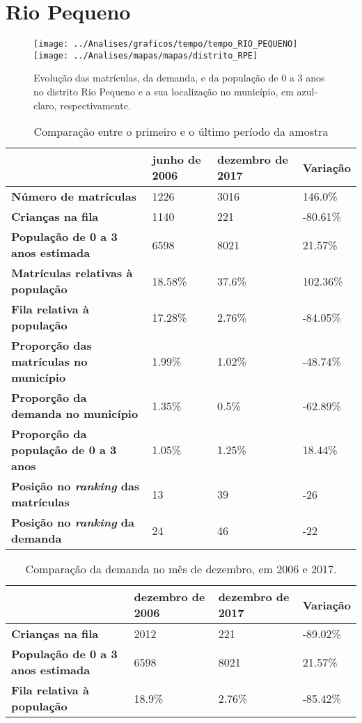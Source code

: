 \section{Rio Pequeno}
\begin{figure}[H]
\centering
\texttt{[image: ../Analises/graficos/tempo/tempo\_RIO\_PEQUENO]}
\texttt{[image: ../Analises/mapas/mapas/distrito\_RPE]}
\caption{Evolução das matrículas, da demanda, e da população de 0 a 3 anos no distrito Rio Pequeno e a sua localização no município, em azul-claro, respectivamente.}
\end{figure}
\begin{table}[H]
\begin{tabular}{l|l|l|l}
\textbf{}                                      & \textbf{junho de 2006}       & \textbf{dezembro de 2017}    & \textbf{Variação} \\ \hline
\textbf{Número de matrículas}                  & 1226 & 3016 & 146.0\% \\ \hline
\textbf{Crianças na fila}                      & 1140 & 221 & -80.61\% \\ \hline
\textbf{População de 0 a 3 anos estimada}      & 6598 & 8021 & 21.57\% \\ \hline
\textbf{Matrículas relativas à população}      & 18.58\% & 37.6\% & 102.36\% \\ \hline
\textbf{Fila relativa à população}             & 17.28\% & 2.76\% & -84.05\% \\ \hline
\textbf{Proporção das matrículas no município} & 1.99\% & 1.02\% & -48.74\% \\ \hline
\textbf{Proporção da demanda no município}     & 1.35\% & 0.5\% & -62.89\% \\ \hline
\textbf{Proporção da população de 0 a 3 anos}  & 1.05\% & 1.25\% & 18.44\% \\ \hline
\textbf{Posição no \textit{ranking} das matrículas}     & 13 & 39 & -26 \\ \hline
\textbf{Posição no \textit{ranking} da demanda}         & 24 & 46 & -22 \\ 
\end{tabular}
\caption{Comparação entre o primeiro e o último período da amostra}
\end{table}
\begin{table}[H]
\begin{tabular}{l|l|l|l}
\textbf{}                                 & \textbf{dezembro de 2006} & \textbf{dezembro de 2017} & \textbf{Variação} \\ \hline
\textbf{Crianças na fila}                      & 2012 & 221 & -89.02\% \\ \hline
\textbf{População de 0 a 3 anos estimada}      & 6598 & 8021 & 21.57\% \\ \hline
\textbf{Fila relativa à população}             & 18.9\% & 2.76\% & -85.42\% \\
\end{tabular}
\caption{Comparação da demanda no mês de dezembro, em 2006 e 2017.}
\end{table}
